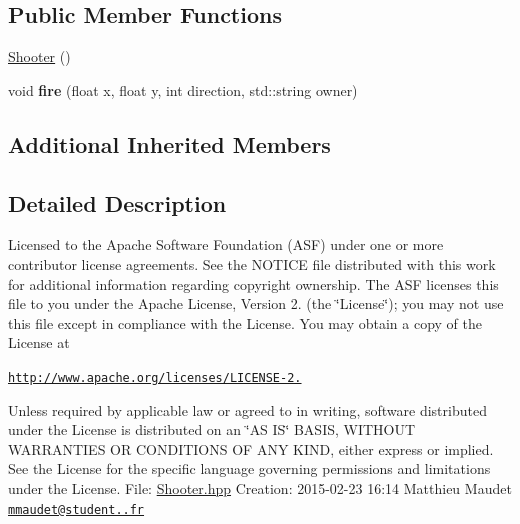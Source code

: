 \subsection*{Public Member Functions}
\begin{DoxyCompactItemize}
\item 
\hyperlink{class_shooter_acc429ebafcc36bb592c752097c22657f}{Shooter} ()
\item 
\hypertarget{class_shooter_adc34229494950169d09804f1d524ac7d}{void {\bfseries fire} (float x, float y, int direction, std\-::string owner)}\label{class_shooter_adc34229494950169d09804f1d524ac7d}

\end{DoxyCompactItemize}
\subsection*{Additional Inherited Members}


\subsection{Detailed Description}
Licensed to the Apache Software Foundation (A\-S\-F) under one or more contributor license agreements. See the N\-O\-T\-I\-C\-E file distributed with this work for additional information regarding copyright ownership. The A\-S\-F licenses this file to you under the Apache License, Version 2. (the \char`\"{}\-License\char`\"{}); you may not use this file except in compliance with the License. You may obtain a copy of the License at

\href{http://www.apache.org/licenses/LICENSE-2.0}{\tt http\-://www.\-apache.\-org/licenses/\-L\-I\-C\-E\-N\-S\-E-\/2.}

Unless required by applicable law or agreed to in writing, software distributed under the License is distributed on an \char`\"{}\-A\-S I\-S\char`\"{} B\-A\-S\-I\-S, W\-I\-T\-H\-O\-U\-T W\-A\-R\-R\-A\-N\-T\-I\-E\-S O\-R C\-O\-N\-D\-I\-T\-I\-O\-N\-S O\-F A\-N\-Y K\-I\-N\-D, either express or implied. See the License for the specific language governing permissions and limitations under the License. File\-: \hyperlink{_shooter_8hpp_source}{Shooter.\-hpp} Creation\-: 2015-\/02-\/23 16\-:14 Matthieu Maudet \href{mailto:mmaudet@student.42.fr}{\tt mmaudet@student..\-fr} 

